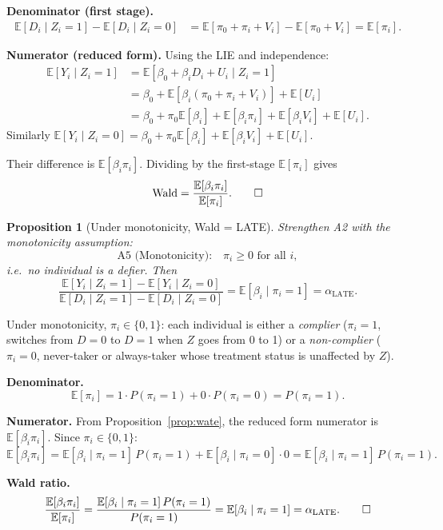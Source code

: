 \documentclass[12pt,a4paper]{article}
\theoremstyle{plain}
\newtheorem{propositio}{Proposition}[section]
\theoremstyle{definition}
\renewenvironment{proof}{\pushQED{\qed}\normalfont}{\popQED\par\nobreak}
\newcommand{\E}{\mathbb{E}}
\newcommand{\LATE}{\alpha_{\mathrm{LATE}}}
\begin{document}
\begin{proof}
\textbf{Denominator (first stage).}
\begin{align*}
  \E[D_i\mid Z_i=1]-\E[D_i\mid Z_i=0]
  &= \E[\pi_0+\pi_i+V_i] - \E[\pi_0+V_i]
  = \E[\pi_i].
\end{align*}

\textbf{Numerator (reduced form).}  Using the LIE and independence:
\begin{align*}
  \E[Y_i\mid Z_i=1]
  &= \E[\beta_0+\beta_i D_i+U_i\mid Z_i=1]\\
  &= \beta_0 + \E[\beta_i(\pi_0+\pi_i+V_i)] + \E[U_i]\\
  &= \beta_0 + \pi_0\E[\beta_i] + \E[\beta_i\pi_i] + \E[\beta_i V_i] + \E[U_i].
\end{align*}
Similarly $\E[Y_i\mid Z_i=0] = \beta_0 + \pi_0\E[\beta_i] + \E[\beta_i V_i] + \E[U_i]$.

Their difference is $\E[\beta_i\pi_i]$.  Dividing by the first-stage $\E[\pi_i]$ gives
\[
  \text{Wald} = \frac{\E[\beta_i\pi_i]}{\E[\pi_i]}. \qedhere
\]
\end{proof}

\begin{propositio}[Under monotonicity, Wald = LATE\label{prop:late}]
Strengthen A2 with the monotonicity assumption:
\[
  \text{A5 (Monotonicity):}\quad \pi_i \ge 0 \text{ for all } i,
\]
i.e.\ no individual is a defier.  Then
\[
  \frac{\E[Y_i\mid Z_i=1]-\E[Y_i\mid Z_i=0]}{\E[D_i\mid Z_i=1]-\E[D_i\mid Z_i=0]}
  = \E[\beta_i\mid \pi_i=1] = \LATE.
\]
\end{propositio}

\begin{proof}
Under monotonicity, $\pi_i\in\{0,1\}$: each individual is either a \emph{complier} ($\pi_i=1$, switches from $D=0$ to $D=1$ when $Z$ goes from 0 to 1) or a \emph{non-complier} ($\pi_i=0$, never-taker or always-taker whose treatment status is unaffected by $Z$).

\textbf{Denominator.}
\[
  \E[\pi_i] = 1\cdot P(\pi_i=1) + 0\cdot P(\pi_i=0) = P(\pi_i=1).
\]

\textbf{Numerator.}  From Proposition~\ref{prop:wate}, the reduced form numerator is $\E[\beta_i\pi_i]$.
Since $\pi_i\in\{0,1\}$:
\[
  \E[\beta_i\pi_i]
  = \E[\beta_i\mid\pi_i=1]\,P(\pi_i=1)
  + \E[\beta_i\mid\pi_i=0]\cdot 0
  = \E[\beta_i\mid\pi_i=1]\,P(\pi_i=1).
\]

\textbf{Wald ratio.}
\[
  \frac{\E[\beta_i\pi_i]}{\E[\pi_i]}
  = \frac{\E[\beta_i\mid\pi_i=1]\,P(\pi_i=1)}{P(\pi_i=1)}
  = \E[\beta_i\mid\pi_i=1]
  = \LATE. \qedhere
\]
\end{proof}
\end{document}
